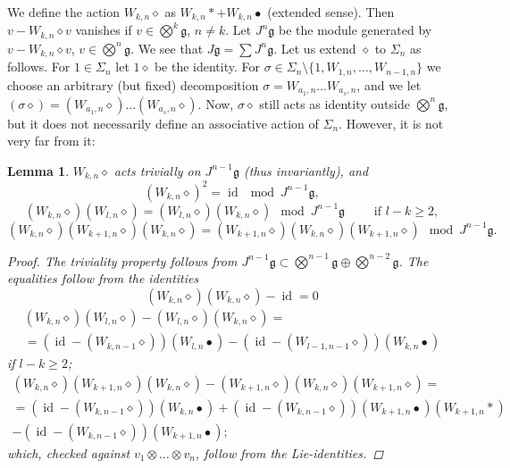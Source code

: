 \documentclass[11pt,a4paper]{amsart}
\newcommand{\plabel}[1]{ \label{#1}}
\newcommand{\plabel}[1]{ \label{#1}\rlap{\smash{${}^{^{[#1]}}$}}}
\newcommand{\plabel}[1]{ \label{#1}}
\DeclareMathOperator{\id}{id}
\newcommand{\botimes}{{\textstyle\bigotimes}}
\theoremstyle{definition}
\theoremstyle{plain}
\newtheorem{lemma}[point]{Lemma}
\begin{document}
We define the action $W_{k,n}\diamond  $ as $W_{k,n}* +W_{k,n}\bullet $ (extended sense).
Then $v-W_{k,n}\diamond v $ vanishes if $v\in\botimes^k\mathfrak g$, $n\neq k$.
Let $J^n\mathfrak g$ be the module generated by $v-W_{k,n}\diamond v $, $v\in\botimes^n\mathfrak g$.
We see that $\displaystyle{J\mathfrak g=\sum J^n\mathfrak g}$.
Let us extend $\diamond$ to $\Sigma_n$ as follows.
For $1\in\Sigma_n$  let $1\diamond$ be the identity.
For $\sigma\in\Sigma_n\setminus\{1,W_{1,n},\ldots,W_{n-1,n}\}$ we choose an arbitrary (but fixed)
decomposition $\sigma=W_{a_1,n}\ldots W_{a_s,n}$, and we let $(\sigma\diamond)=(W_{a_1,n}\diamond)\ldots(W_{a_s,n}\diamond)$.
Now,
$\sigma\diamond$ still acts as identity outside $\botimes^n\mathfrak g$, but it does not necessarily define an associative action of $\Sigma_n$.
However, it is not very far from it:
\begin{lemma}\plabel{lem:shallow}
 $W_{k,n}\diamond$ acts trivially on $J^{n-1}\mathfrak g$ (thus invariantly), and
\[(W_{k,n}\diamond )^2=\id\mod J^{n-1}\mathfrak g,\tag{P1}\]
\[(W_{k,n}\diamond )(W_{l,n}\diamond )= (W_{l,n}\diamond )(W_{k,n}\diamond )\mod J^{n-1}\mathfrak g\qquad \text{ if } l-k\geq2,\tag{P2}\]
\[(W_{k,n}\diamond )(W_{k+1,n}\diamond )(W_{k,n}\diamond )= (W_{k+1,n}\diamond )(W_{k,n}\diamond )(W_{k+1,n}\diamond )\mod J^{n-1}\mathfrak g.\tag{P3}\]
\begin{proof}
The triviality property follows from $ J^{n-1}\mathfrak g\subset \botimes^{n-1}\mathfrak g\oplus\botimes^{n-2}\mathfrak g$.
The equalities follow from the identities
\[(W_{k,n}\diamond )(W_{k,n}\diamond )-\id=0\tag{P1'}\]
\begin{multline}
(W_{k,n}\diamond )(W_{l,n}\diamond )- (W_{l,n}\diamond )(W_{k,n}\diamond )=\\
=(\id-(W_{k,n-1}\diamond ))(W_{l,n}\bullet)-(\id-(W_{l-1,n-1}\diamond ))(W_{k,n}\bullet)
\tag{P2'}\end{multline}
if $l-k\geq2$;
\begin{multline}(W_{k,n}\diamond )(W_{k+1,n}\diamond )(W_{k,n}\diamond )-
(W_{k+1,n}\diamond )(W_{k,n}\diamond )(W_{k+1,n}\diamond )=\\
=(\id-(W_{k,n-1}\diamond ))(W_{k,n}\bullet)+(\id-(W_{k,n-1}\diamond ))(W_{k+1,n}\bullet)(W_{k+1,n}*)
 \\  -(\id-(W_{k,n-1}\diamond ))(W_{k+1,n}\bullet);\tag{P3'}\end{multline}
which, checked against $v_1\otimes\ldots\otimes v_n$, follow from  the Lie-identities.
\end{proof}
\end{lemma}
\end{document}
